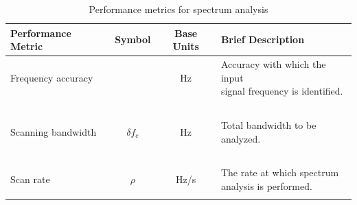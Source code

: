 \begin{table}[tbp]
\centering
\caption{Performance metrics for spectrum analysis}
\begin{tabular}{l c c l }
\toprule
{\bfseries Performance Metric} & {\bfseries Symbol} & {\bfseries Base Units} & {\bfseries Brief Description}\\
\midrule
Frequency accuracy & ~ & Hz & \parbox[t]{54 mm}{Accuracy with which the input\\signal frequency is identified.}\\
~ & ~ & ~ & \\
Scanning bandwidth & $\delta f_c$ & Hz & \parbox[t]{54 mm}{Total bandwidth to be\\analyzed.}\\
~ & ~ & ~ & \\
Scan rate & $\rho$ & Hz/s & \parbox[t]{54 mm}{The rate at which spectrum\\analysis is performed.}\\
\bottomrule
\label{TableExample}
\end{tabular}
\end{table}




